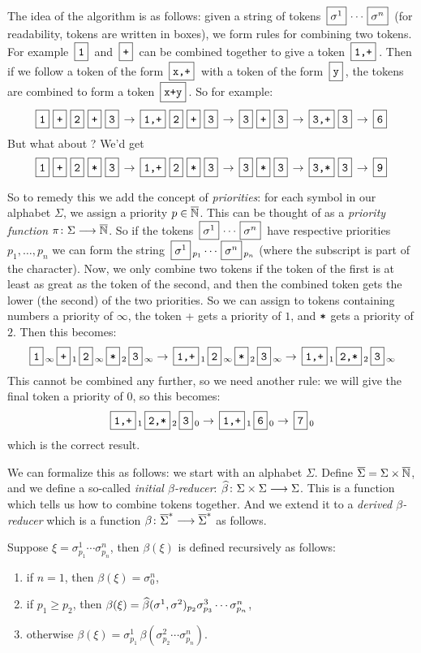 \documentclass{llncs}
\newcounter{algo}
\begin{document}
The idea of the algorithm is as follows: given a string of tokens $\mb{\sigma^1}\cdots\mb{\sigma^n}$ (for readability, tokens are written in boxes), we form rules for combining two tokens.
For example $\mb{\ttt1}$ and $\mb{\ttt+}$ can be combined together to give a token $\mb{\ttt{1,+}}$.
Then if we follow a token of the form $\mb{\ttt{x,+}}$ with a token of the form $\mb{\ttt y}$, the tokens are combined to form a token $\mb{\ttt{x+y}}$.
So for example:
\[ \mbt{1} \mbt{+} \mbt{2} \mbt{+} \mbt{3} \to \mbt{1,+} \mbt2 \mbt+ \mbt3 \to \mbt{3} \mbt+ \mbt3 \to \mbt{3,+} \mbt3 \to \mbt6 \]
But what about ?
We'd get
\[ \mbt1 \mbt+ \mbt2 \mbt* \mbt3 \to \mbt{1,+} \mbt2 \mbt* \mbt3 \to \mbt3 \mbt* \mbt3 \to \mbt{3,*} \mbt3 \to \mbt9 \]

So to remedy this we add the concept of \textit{priorities}: for each symbol in our alphabet $\Sigma$, we assign a priority $p\in\overline{\mathbb N}$.
This can be thought of as a \textit{priority function} $\pi\colon\Sigma\longrightarrow\overline{\mathbb N}$.
So if the tokens $\mb{\sigma^1}\cdots\mb{\sigma^n}$ have respective priorities $p_1,\dots,p_n$ we can form the string $\mb{\sigma^1}_{p_1}\cdots\mb{\sigma^n}_{p_n}$ (where the subscript is part of the
character).
Now, we only combine two tokens if the token of the first is at least as great as the token of the second, and then the combined token gets the lower (the second) of the two priorities.
So we can assign to tokens containing numbers a priority of $\infty$, the token \ttt+ gets a priority of $1$, and $\texttt*$ gets a priority of $2$.
Then this becomes:
\[ \mbt1_\infty \mbt+_1 \mbt2_\infty \mbt*_2 \mbt3_\infty \to \mbt{1,+}_1 \mbt2_\infty \mbt*_2 \mbt3_\infty \to \mbt{1,+}_1 \mbt{2,*}_2 \mbt3_\infty \]
This cannot be combined any further, so we need another rule: we will give the final token a priority of $0$, so this becomes:
\[ \mbt{1,+}_1 \mbt{2,*}_2 \mbt3_0 \to \mbt{1,+}_1 \mbt{6}_0 \to \mbt{7}_0 \]
which is the correct result.

We can formalize this as follows: we start with an alphabet $\Sigma$.
Define $\overline\Sigma=\Sigma\times\overline{\mathbb N}$, and we define a so-called \textit{initial $\beta$-reducer}: $\widehat\beta\colon \Sigma\times\Sigma \longrightarrow \Sigma$.
This is a function which tells us how to combine tokens together.
And we extend it to a \textit{derived $\beta$-reducer} which is a function $\beta\colon\overline\Sigma^*\longrightarrow\overline\Sigma^*$ as follows.

Suppose $\xi=\sigma^1_{p_1}\cdots\sigma^n_{p_n}$, then $\beta(\xi)$ is defined recursively as follows:
\begin{enumerate}
    \item if $n=1$, then $\beta(\xi)=\sigma^n_0$,
    \item if $p_1\geq p_2$, then $\beta(\xi)=\widehat\beta(\sigma^1,\sigma^2)_{p_2}\sigma^3_{p_3}\cdots\sigma^n_{p_n}$,
    \item otherwise $\beta(\xi)=\sigma^1_{p_1}\,\beta(\sigma^2_{p_2}\cdots\sigma^n_{p_n})$.
\end{enumerate}
\end{document}

